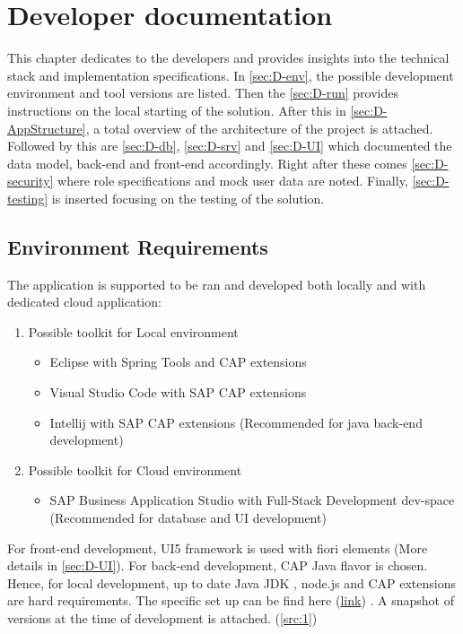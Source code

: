 \chapter{Developer documentation}
\label{ch:impl}

This chapter dedicates to the developers and provides insights into the technical stack and implementation specifications. In \autoref{sec:D-env}, the possible development environment and tool versions are listed. Then the \autoref{sec:D-run} provides instructions on the local starting of the solution. After this in \autoref{sec:D-AppStructure}, a total overview of the architecture of the project is attached. Followed by this are \autoref{sec:D-db}, \autoref{sec:D-srv} and \autoref{sec:D-UI} which documented the data model, back-end and front-end accordingly. Right after these comes \autoref{sec:D-security} where role specifications and mock user data are noted. Finally, \autoref{sec:D-testing} is inserted focusing on the testing of the solution. 

\section{Environment Requirements}
\label{sec:D-env}

The application is supported to be ran and developed both locally and with dedicated cloud application: 
\begin{enumerate}
    \item Possible toolkit for Local environment
        \begin{itemize}
            \item Eclipse \cite{eclipse} with Spring Tools and CAP extensions
            \item Visual Studio Code \cite{vscode} with SAP CAP extensions
            \item Intellij \cite{intellij} with SAP CAP extensions (Recommended for java back-end development)
        \end{itemize}
    \item Possible toolkit for Cloud environment
        \begin{itemize}
            \item SAP Business Application Studio \cite{bas} with Full-Stack Development dev-space (Recommended for database and UI development)
        \end{itemize}
\end{enumerate}

For front-end development, UI5 framework \cite{ui5-toolkit} is used with fiori elements \cite{fiorielements} (More details in \ref{sec:D-UI}). 
For back-end development, CAP Java \cite{cap-about}\cite{cap-java} flavor is chosen.
Hence, for local development, up to date Java JDK \cite{java}, node.js \cite{nodejs} and CAP extensions are hard requirements. The specific set up can be find here (\hyperlink{https://developers.sap.com/tutorials/btp-app-prepare-dev-environment-cap.html}{link}) \cite{proj-setup-intellij}.
A snapshot of versions at the time of development is attached. (\autoref{src:1})

